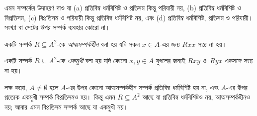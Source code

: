 \documentclass[../../../include/open-logic-section]{subfiles}
\begin{document}
\begin{prob}
এমন সম্পর্কের উদাহরণ দাও যা (a) প্রতিবিম্ব ধর্মবিশিষ্ট ও প্রতিসম কিন্তু পরিযায়ী নয়, (b) প্রতিবিম্ব ধর্মবিশিষ্ট ও বিপ্রতিসম, (c) বিপ্রতিসম ও পরিযায়ী কিন্তু প্রতিবিম্ব ধর্মবিশিষ্ট নয়, এবং (d) প্রতিবিম্ব ধর্মবিশিষ্ট, প্রতিসম ও পরিযায়ী। সংখ্যা বা সেটের উপর সম্পর্ক ব্যবহার কোরো না।
\end{prob}

\begin{defn}[আত্মসম্পর্কহীনতা]
একটি সম্পর্ক $R \subseteq A^2$-কে \emph{আত্মসম্পর্কহীন} বলা হয় যদি সকল $x \in A$-এর জন্য $Rxx$ সত্য না হয়।
\end{defn}

\begin{defn}[একমুখিতা]
একটি সম্পর্ক $R \subseteq A^2$-কে \emph{একমুখী} বলা হয় যদি কোনো $x,y\in A$ যুগলের জন্যই $Rxy$ ও~$Ryx$ একসঙ্গে সত্য না হয়।
\end{defn}

লক্ষ করো, $A \neq \emptyset$ হলে $A$-এর উপর কোনো আত্মসম্পর্কহীন সম্পর্ক প্রতিবিম্ব ধর্মবিশিষ্ট হয় না, এবং $A$-এর উপর প্রত্যেক একমুখী সম্পর্ক বিপ্রতিসমও হয়। কিন্তু এমন $R \subseteq A^2$ আছে যা প্রতিবিম্ব ধর্মবিশিষ্টও নয়, আত্মসম্পর্কহীনও নয়; আবার এমন বিপ্রতিসম সম্পর্ক আছে যা একমুখী নয়।
\end{document}
